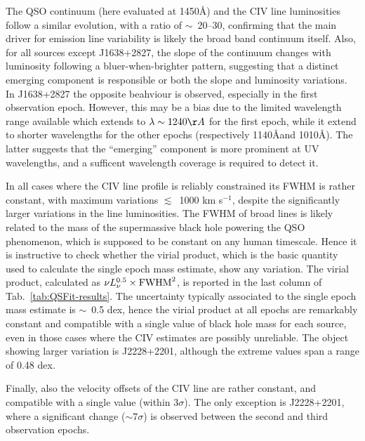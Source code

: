 \documentclass{article}
\begin{document}
The QSO continuum (here evaluated at 1450\AA) and the CIV line luminosities follow a similar evolution, with a ratio of $\sim$~20--30, confirming that the main driver for emission line variability is likely the broad band continuum itself.  Also, for all sources except J1638+2827, the slope of the continuum changes with luminosity following a bluer-when-brighter pattern, suggesting that a distinct emerging component is responsible or both the slope and luminosity variations.  In J1638+2827 the opposite beahviour is observed, especially in the first observation epoch.  However, this may be a bias due to the limited wavelength range available which extends to $\lambda \sim 1240\AA$ for the first epoch, while it extend to shorter wavelengths for the other epochs (respectively 1140\AA and 1010\AA).  The latter suggests that the ``emerging'' component is more prominent at UV wavelengths, and a sufficent wavelength coverage is required to detect it.

In all cases where the CIV line profile is reliably constrained its FWHM is rather constant, with maximum variations $\lesssim$~1000 km s$^{-1}$, despite the significantly larger variations in the line luminosities.  The FWHM of broad lines is likely related to the mass of the supermassive black hole powering the QSO phenomenon, which is supposed to be constant on any human timescale.  Hence it is instructive to check whether the virial product, which is the basic quantity used to calculate the single epoch mass estimate, show any variation.  The virial product, calculated as $\nu L_{\nu}^{0.5} \times {\rm FWHM}^2$, is reported in the last column of Tab.~\ref{tab:QSFit-results}.  The uncertainty typically associated to the single epoch mass estimate is $\sim$~0.5 dex, hence the virial product at all epochs are remarkably constant and compatible with a single value of black hole mass for each source, even in those cases where the CIV estimates are possibly unreliable.  The object showing larger variation is J2228+2201, although the extreme values span a range of 0.48 dex.

Finally, also the velocity offsets of the CIV line are rather constant, and compatible with a single value (within 3$\sigma$).  The only exception is J2228+2201, where a significant change ($\sim 7 \sigma$) is observed between the second and third observation epochs.
\end{document}
